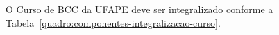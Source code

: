 \documentclass[
	12pt,				%
	openright,			%
  oneside,     %
	a4paper,			%
	english,			%
	french,				%
	spanish,			%
	brazil				%
	]{abntex2}
\begin{document}



O Curso de BCC da UFAPE deve ser integralizado conforme a Tabela~\ref{quadro:componentes-integralizacao-curso}.
\end{document}
